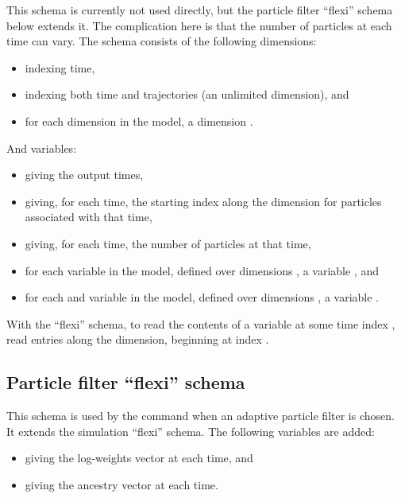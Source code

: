 This schema is currently not used directly, but the particle filter ``flexi''
schema below extends it. The complication here is that the number of
particles at each time can vary. The schema consists of the following
dimensions:
\begin{itemize}
\item {} indexing time,
\item {} indexing both time and trajectories (an unlimited dimension),
  and
\item for each dimension  in the model, a dimension
  .
\end{itemize}
And variables:
\begin{itemize}
\item {} giving the output times,
\item {} giving, for each time, the starting index along the
   dimension for particles associated with that time,
\item {} giving, for each time, the number of particles at that
  time,
\item for each  variable  in the model,
  defined over dimensions , a variable
  , and
\item for each  and  variable  in the
  model, defined over dimensions , a variable
  .
\end{itemize}

\begin{tip}
With the ``flexi'' schema, to read the contents of a variable at some time
index , read  entries along the 
dimension, beginning at index .
\end{tip}

\subsection{Particle filter ``flexi'' schema}

This schema is used by the  command when an adaptive
particle filter is chosen. It extends the simulation ``flexi'' schema. The
following variables are added:
\begin{itemize}
\item {} giving the log-weights vector at each time, and
\item {} giving the ancestry vector at each time.
\end{itemize}


